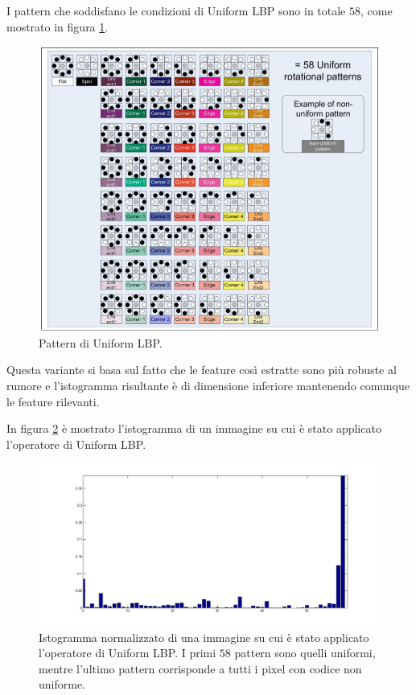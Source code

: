 I pattern che soddisfano le condizioni di Uniform \acs{LBP} sono in totale $58$, come mostrato in figura \ref{fig:uniformLBP}.

\begin{figure}[ht]
\begin{center}
\includegraphics[width=.95\textwidth]{img/uniform_LBP}
\caption{ Pattern di Uniform LBP.}
\label{fig:uniformLBP}
\end{center}
\end{figure}

Questa variante si basa sul fatto che le feature così estratte sono più robuste al rumore e l'istogramma risultante è di dimensione inferiore mantenendo comunque le feature rilevanti.

In figura \ref{fig:istUniformLBP} è mostrato l'istogramma di un immagine su cui è stato applicato l'operatore di Uniform \acs{LBP}.

\begin{figure}[ht]
\begin{center}
\includegraphics[width=.95\textwidth]{img/hist-uniform}
\caption{ Istogramma normalizzato di una immagine su cui è stato applicato l'operatore di Uniform \acs{LBP}. I primi $58$ pattern sono quelli uniformi, mentre l'ultimo pattern corrisponde a tutti i pixel con codice non uniforme.}
\label{fig:istUniformLBP}
\end{center}
\end{figure}

